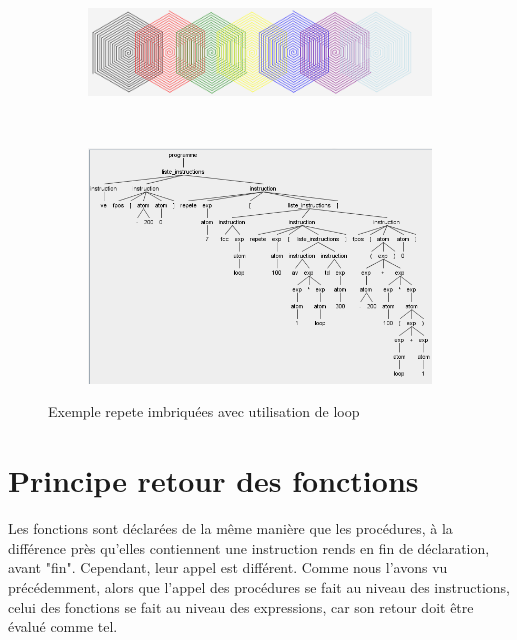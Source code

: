 \documentclass[a4paper,11pt]{article}
\begin{document}
\begin{figure}[!h]
	\centering
	\begin{subfigure}[t]{.5\textwidth}
		\includegraphics[width=\textwidth]{img/loop_figure}
	\end{subfigure}
	~
	\begin{subfigure}[t]{0.7\textwidth}
		\includegraphics[width=\textwidth]{img/loop_tree}
	\end{subfigure}
	\caption{Exemple repete imbriquées avec utilisation de loop}
\end{figure}

\section{Principe retour des fonctions}
Les fonctions sont déclarées de la même manière que les procédures, à la différence près qu'elles contiennent une instruction rends en fin de déclaration, avant "fin". Cependant, leur appel est différent. Comme nous l'avons vu précédemment, alors que l'appel des procédures se fait au niveau des instructions, celui des fonctions se fait au niveau des expressions, car son retour doit être évalué comme tel.
\end{document}
